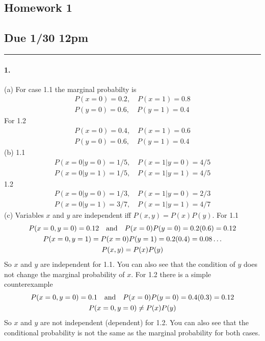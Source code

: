 \documentclass[../main.tex]{subfiles}
\begin{document}
\setcounter{section}{1}
\begin{center}
    \section*{Homework 1}
    \subsection*{Due 1/30 12pm}
\end{center}
\hrule \vspace{10px}

\paragraph{1.}(a)
For case 1.1 the marginal probabilty is
\begin{align*}
    P(x = 0) = 0.2, \quad P(x = 1) = 0.8 \\
    P(y = 0) = 0.6, \quad P(y = 1) = 0.4
\end{align*}
For 1.2
\begin{align*}
    P(x = 0) = 0.4, \quad P(x = 1) = 0.6 \\
    P(y = 0) = 0.6, \quad P(y = 1) = 0.4
\end{align*}
(b) 1.1
\begin{align*}
    P(x=0 | y=0) = 1/5, \quad P(x=1 | y=0) = 4/5 \\
    P(x=0 | y=1) = 1/5, \quad P(x=1 | y=1) = 4/5
\end{align*}
1.2
\begin{align*}
    P(x=0 | y=0) = 1/3, \quad P(x=1 | y=0) = 2/3 \\
    P(x=0 | y=1) = 3/7, \quad P(x=1 | y=1) = 4/7
\end{align*}
(c) Variables $x$ and $y$ are independent iff $P(x,y) = P(x)P(y)$. For 1.1
\begin{gather*}
    P(x=0, y=0) = 0.12 \qand P(x=0) P(y=0) = 0.2(0.6) = 0.12 \\
    P(x=0, y=1) = P(x=0) P(y=1) = 0.2(0.4) = 0.08 \dots \\
    P(x,y) = P(x)P(y)
\end{gather*}
So $x$ and $y$ are independent for 1.1. You can also see that the condition of $y$ does not change
the marginal probability of $x$. For 1.2 there is a simple counterexample
\begin{gather*}
    P(x=0, y=0) = 0.1 \qand P(x=0) P(y=0) = 0.4(0.3) = 0.12 \\
    P(x=0, y=0) \neq P(x)P(y)
\end{gather*}
So $x$ and $y$ are not independent (dependent) for 1.2. You can also see that the conditional
probability is not the same as the marginal probability for both cases.
\end{document}
